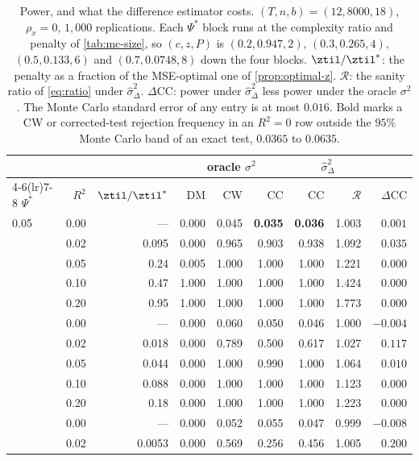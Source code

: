 \begin{table}[htbp]
\centering
\caption{Power, and what the difference estimator costs. $(T,n,b)=(12,8000,18)$, $\rho_x=0$, $1{,}000$ replications. Each $\Psi^*$ block runs at the complexity ratio and penalty of \cref{tab:mc-size}, so $(c,z,P)$ is $(0.2,0.947,2)$, $(0.3,0.265,4)$, $(0.5,0.133,6)$ and $(0.7,0.0748,8)$ down the four blocks. $\ztil/\ztil^*$: the penalty as a fraction of the MSE-optimal one of \cref{prop:optimal-z}. $\mathcal R$: the sanity ratio of \cref{eq:ratio} under $\hat\sigma^2_\Delta$. $\Delta$CC: power under $\hat\sigma^2_\Delta$ less power under the oracle $\sigma^2$. The Monte Carlo standard error of any entry is at most $0.016$. Bold marks a CW or corrected-test rejection frequency in an $R^2=0$ row outside the $95\%$ Monte Carlo band of an exact test, $0.0365$ to $0.0635$.}\label{tab:mc-power}
\small
\begin{tabular}{lrrrrrrrr}
\toprule
& & & \multicolumn{3}{c}{oracle $\sigma^2$} & \multicolumn{2}{c}{$\hat\sigma^2_\Delta$} & \\
\cmidrule(lr){4-6}\cmidrule(lr){7-8}
$\Psi^*$ & $R^2$ & $\ztil/\ztil^*$ & DM & CW & CC & CC & $\mathcal R$ & $\Delta$CC \\
\midrule
0.05 & 0.00 & --- & 0.000 & 0.045 & \textbf{0.035} & \textbf{0.036} & 1.003 & $0.001$ \\
 & 0.02 & 0.095 & 0.000 & 0.965 & 0.903 & 0.938 & 1.092 & $0.035$ \\
 & 0.05 & 0.24 & 0.005 & 1.000 & 1.000 & 1.000 & 1.221 & $0.000$ \\
 & 0.10 & 0.47 & 1.000 & 1.000 & 1.000 & 1.000 & 1.424 & $0.000$ \\
 & 0.20 & 0.95 & 1.000 & 1.000 & 1.000 & 1.000 & 1.773 & $0.000$ \\
\addlinespace
0.20 & 0.00 & --- & 0.000 & 0.060 & 0.050 & 0.046 & 1.000 & $-0.004$ \\
 & 0.02 & 0.018 & 0.000 & 0.789 & 0.500 & 0.617 & 1.027 & $0.117$ \\
 & 0.05 & 0.044 & 0.000 & 1.000 & 0.990 & 1.000 & 1.064 & $0.010$ \\
 & 0.10 & 0.088 & 0.000 & 1.000 & 1.000 & 1.000 & 1.123 & $0.000$ \\
 & 0.20 & 0.18 & 0.000 & 1.000 & 1.000 & 1.000 & 1.223 & $0.000$ \\
\addlinespace
0.50 & 0.00 & --- & 0.000 & 0.052 & 0.055 & 0.047 & 0.999 & $-0.008$ \\
 & 0.02 & 0.0053 & 0.000 & 0.569 & 0.256 & 0.456 & 1.005 & $0.200$ \\

\end{tabular}
\end{table}
